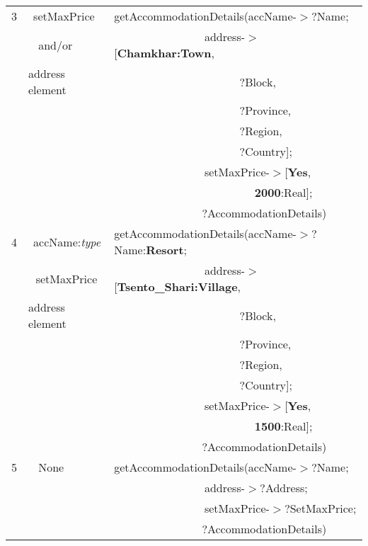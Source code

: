 \begin{table} [tbph]
\begin{tabular}{|l|l|l|}
\hline
 3&$~~$setMaxPrice & getAccommodationDetails(accName-$>?$Name;\\
  &$~~~~$and/or      &$~~~~~~~~~~~~~~~~~~~~~~~~~~~~~~~~~~~~$address-$>$[\textbf{Chamkhar:Town}, \\
  &address element     &$~~~~~~~~~~~~~~~~~~~~~~~~~~~~~~~~~~~~~~~~~~~~~~~~~~?$Block, \\
  &                       &$~~~~~~~~~~~~~~~~~~~~~~~~~~~~~~~~~~~~~~~~~~~~~~~~~~?$Province,  \\
  &                       &$~~~~~~~~~~~~~~~~~~~~~~~~~~~~~~~~~~~~~~~~~~~~~~~~~~?$Region, \\
  &                       &$~~~~~~~~~~~~~~~~~~~~~~~~~~~~~~~~~~~~~~~~~~~~~~~~~~?$Country]; \\ 
  &                       &$~~~~~~~~~~~~~~~~~~~~~~~~~~~~~~~~~~~~$setMaxPrice-$>$[\textbf{Yes},\\
  &                       &$~~~~~~~~~~~~~~~~~~~~~~~~~~~~~~~~~~~~~~~~~~~~~~~~~~~~~~~~$\textbf{2000}:Real]; \\ 
  &                       &$~~~~~~~~~~~~~~~~~~~~~~~~~~~~~~~~~~~?$AccommodationDetails)\\
\hline
 4&$~~$accName:\emph{type} & getAccommodationDetails(accName-$>?$Name:\textbf{Resort};\\
  &$~~~$setMaxPrice      &$~~~~~~~~~~~~~~~~~~~~~~~~~~~~~~~~~~~~$address-$>$[\textbf{Tsento\_Shari:Village}, \\
  &address element      &$~~~~~~~~~~~~~~~~~~~~~~~~~~~~~~~~~~~~~~~~~~~~~~~~~~?$Block, \\
  &                       &$~~~~~~~~~~~~~~~~~~~~~~~~~~~~~~~~~~~~~~~~~~~~~~~~~~?$Province,  \\
  &                       &$~~~~~~~~~~~~~~~~~~~~~~~~~~~~~~~~~~~~~~~~~~~~~~~~~~?$Region, \\
  &                       &$~~~~~~~~~~~~~~~~~~~~~~~~~~~~~~~~~~~~~~~~~~~~~~~~~~?$Country]; \\ 
  &                       &$~~~~~~~~~~~~~~~~~~~~~~~~~~~~~~~~~~~~$setMaxPrice-$>$[\textbf{Yes},\\
  &                       &$~~~~~~~~~~~~~~~~~~~~~~~~~~~~~~~~~~~~~~~~~~~~~~~~~~~~~~~~$\textbf{1500}:Real]; \\ 
  &                       &$~~~~~~~~~~~~~~~~~~~~~~~~~~~~~~~~~~~?$AccommodationDetails)\\
\hline
 5&$~~~~$None & getAccommodationDetails(accName-$>?$Name;\\
  &        &$~~~~~~~~~~~~~~~~~~~~~~~~~~~~~~~~~~~~$address-$>?$Address; \\
  &        &$~~~~~~~~~~~~~~~~~~~~~~~~~~~~~~~~~~~~$setMaxPrice-$>?$SetMaxPrice; \\
  &        &$~~~~~~~~~~~~~~~~~~~~~~~~~~~~~~~~~~~?$AccommodationDetails)\\
\hline
\end{tabular} 
\end{table}

